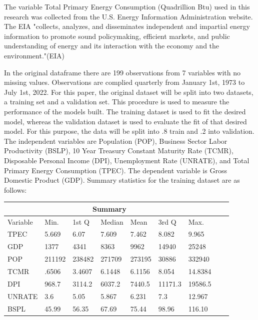 \documentclass[12pt]{article}
\begin{document}
The variable Total Primary Energy Consumption (Quadrillion Btu) used in this research was collected from the U.S. Energy Information Administration website. 
The EIA "collects, analyzes, and disseminates independent and impartial energy information to promote sound policymaking, efficient markets, and public understanding of energy and its interaction with the economy and the environment."(EIA)


In the original dataframe there are 199 observations from 7 variables with no missing values.
Observations are complied quarterly from January 1st, 1973 to July 1st, 2022.  
For this paper, the original dataset will be split into two datasets, a training set and a validation set. 
This procedure is used to measure the performance of the models built. 
The training dataset is used to fit the desired model, whereas the validation dataset is used to evaluate the fit of that desired model. 
For this purpose, the data will be split into .8 train and .2 into validation.
The independent variables are Population (POP), Business Sector Labor Productivity (BSLP), 10 Year Treasury Constant Maturity Rate (TCMR), Disposable Personal Income (DPI), Unemployment Rate (UNRATE), and Total Primary Energy Consumption (TPEC). 
The dependent variable is Gross Domestic Product (GDP).
Summary statistics for the training dataset are as follows:

\begin{center}
\begin{tabular}{ |p{1.75cm}||p{1.25cm}|p{1.25cm}|p{1.25cm}|p{1.25cm}|p{1.25cm}|p{1.25cm}|p{1.25cm}|p{1.25cm}| }
  \hline
  \multicolumn{7}{|c|}{Summary} \\
  \hline
  Variable & Min. & 1st Q & Median & Mean & 3rd Q & Max. \\
  \hline
  TPEC & 5.669 & 6.07& 7.609 & 7.462 & 8.082 & 9.965\\
  GDP &  1377 & 4341 & 8363 & 9962 & 14940 & 25248\\
  POP & 211192 & 238482 & 271709 & 273195 & 30886 & 332940\\
  TCMR & .6506 & 3.4607 & 6.1448 & 6.1156 & 8.054 & 14.8384\\
  DPI & 968.7 & 3114.2 & 6037.2 & 7440.5 & 11171.3 & 19586.5\\
  UNRATE & 3.6 & 5.05 & 5.867 & 6.231 & 7.3 & 12.967\\
  BSPL & 45.99 & 56.35 & 67.69 & 75.44 & 98.96 & 116.10\\
  \hline
\end{tabular}
\end{center}
\end{document}
